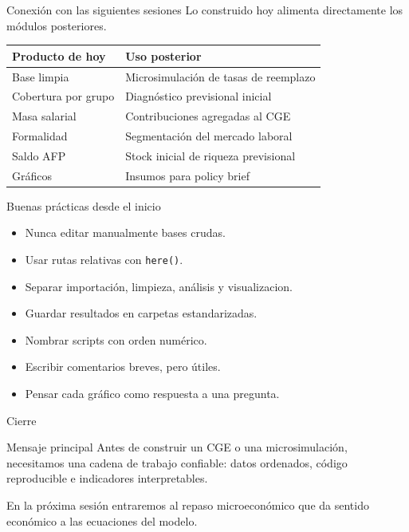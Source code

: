 \documentclass[aspectratio=169,11pt]{beamer}
\begin{document}
\begin{frame}{Conexión con las siguientes sesiones}
Lo construido hoy alimenta directamente los módulos posteriores.

\vspace{0.3cm}
\begin{table}
\centering
\small
\begin{tabular}{p{4.0cm} p{7.0cm}}
\toprule
Producto de hoy & Uso posterior \\
\midrule
Base limpia & Microsimulación de tasas de reemplazo \\
Cobertura por grupo & Diagnóstico previsional inicial \\
Masa salarial & Contribuciones agregadas al CGE \\
Formalidad & Segmentación del mercado laboral \\
Saldo AFP & Stock inicial de riqueza previsional \\
Gráficos & Insumos para policy brief \\
\bottomrule
\end{tabular}
\end{table}
\end{frame}

\begin{frame}{Buenas prácticas desde el inicio}
\begin{itemize}
  \item Nunca editar manualmente bases crudas.
  \item Usar rutas relativas con \texttt{here()}.
  \item Separar importación, limpieza, análisis y visualizacion.
  \item Guardar resultados en carpetas estandarizadas.
  \item Nombrar scripts con orden numérico.
  \item Escribir comentarios breves, pero útiles.
  \item Pensar cada gráfico como respuesta a una pregunta.
\end{itemize}
\end{frame}

\begin{frame}{Cierre}
\begin{block}{Mensaje principal}
Antes de construir un CGE o una microsimulación, necesitamos una cadena de trabajo confiable: datos ordenados, código reproducible e indicadores interpretables.
\end{block}

\vspace{0.4cm}
En la próxima sesión entraremos al repaso microeconómico que da sentido económico a las ecuaciones del modelo.
\end{frame}
\end{document}
